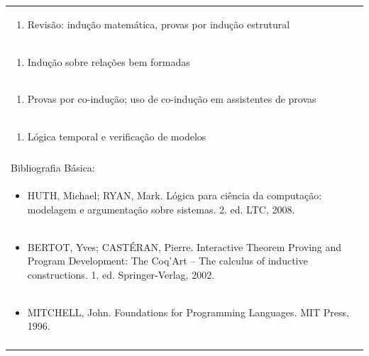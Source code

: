 \documentclass[11pt]{article}
\begin{document}
\begin{center}
\begin{longtable}{|p{4cm}|p{4cm}|p{4cm}|p{4cm}|}
\multicolumn{4}{|p{\dimexpr 16cm + 6\tabcolsep\relax}|}{\begin{enumerate}[start=10]\item Revisão: indução matemática, provas por indução estrutural\end{enumerate}}\\
\multicolumn{4}{|p{\dimexpr 16cm + 6\tabcolsep\relax}|}{\begin{enumerate}[start=11]\item Indução sobre relações bem formadas\end{enumerate}}\\
\multicolumn{4}{|p{\dimexpr 16cm + 6\tabcolsep\relax}|}{\begin{enumerate}[start=12]\item Provas por co-indução; uso de co-indução em assistentes de provas\end{enumerate}}\\
\multicolumn{4}{|p{\dimexpr 16cm + 6\tabcolsep\relax}|}{\begin{enumerate}[start=13]\item Lógica temporal e verificação de modelos\end{enumerate}}\\
\multicolumn{4}{|p{\dimexpr 16cm + 6\tabcolsep\relax}|}{}\\
\hline
\multicolumn{4}{|p{16cm}|}{Bibliografia Básica:}\\*
\multicolumn{4}{|p{\dimexpr 16cm + 6\tabcolsep\relax}|}{\begin{itemize}\item HUTH, Michael; RYAN, Mark. Lógica para ciência da computação: modelagem e argumentação sobre sistemas. 2. ed. LTC, 2008.\end{itemize}}\\
\multicolumn{4}{|p{\dimexpr 16cm + 6\tabcolsep\relax}|}{\begin{itemize}\item BERTOT, Yves; CASTÉRAN, Pierre. Interactive Theorem Proving and Program Development: The Coq'Art – The calculus of inductive constructions. 1. ed. Springer-Verlag, 2002.\end{itemize}}\\
\multicolumn{4}{|p{\dimexpr 16cm + 6\tabcolsep\relax}|}{\begin{itemize}\item MITCHELL, John. Foundations for Programming Languages. MIT Press, 1996.\end{itemize}}\\
\multicolumn{4}{|p{16cm}|}{}\\

\end{longtable}
\end{center}
\end{document}
